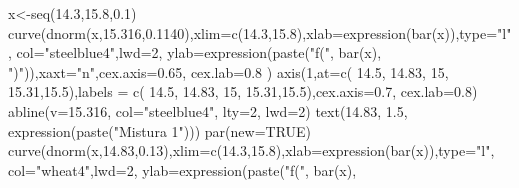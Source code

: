 \documentclass[
  letterpaper,
  DIV=11,
  numbers=noendperiod]{scrartcl}
\newenvironment{Shaded}{\begin{snugshade}}{\end{snugshade}}
\newcommand{\AttributeTok}[1]{\textcolor[rgb]{0.40,0.45,0.13}{#1}}
\newcommand{\ConstantTok}[1]{\textcolor[rgb]{0.56,0.35,0.01}{#1}}
\newcommand{\DecValTok}[1]{\textcolor[rgb]{0.68,0.00,0.00}{#1}}
\newcommand{\FloatTok}[1]{\textcolor[rgb]{0.68,0.00,0.00}{#1}}
\newcommand{\FunctionTok}[1]{\textcolor[rgb]{0.28,0.35,0.67}{#1}}
\newcommand{\NormalTok}[1]{\textcolor[rgb]{0.00,0.23,0.31}{#1}}
\newcommand{\OtherTok}[1]{\textcolor[rgb]{0.00,0.23,0.31}{#1}}
\newcommand{\StringTok}[1]{\textcolor[rgb]{0.13,0.47,0.30}{#1}}
\begin{document}
\begin{Shaded}
\begin{Highlighting}[]
\NormalTok{x}\OtherTok{\textless{}{-}}\FunctionTok{seq}\NormalTok{(}\FloatTok{14.3}\NormalTok{,}\FloatTok{15.8}\NormalTok{,}\FloatTok{0.1}\NormalTok{) }
\FunctionTok{curve}\NormalTok{(}\FunctionTok{dnorm}\NormalTok{(x,}\FloatTok{15.316}\NormalTok{,}\FloatTok{0.1140}\NormalTok{),}\AttributeTok{xlim=}\FunctionTok{c}\NormalTok{(}\FloatTok{14.3}\NormalTok{,}\FloatTok{15.8}\NormalTok{),}\AttributeTok{xlab=}\FunctionTok{expression}\NormalTok{(}\FunctionTok{bar}\NormalTok{(x)),}\AttributeTok{type=}\StringTok{"l"}\NormalTok{,}
      \AttributeTok{col=}\StringTok{"steelblue4"}\NormalTok{,}\AttributeTok{lwd=}\DecValTok{2}\NormalTok{, }\AttributeTok{ylab=}\FunctionTok{expression}\NormalTok{(}\FunctionTok{paste}\NormalTok{(}\StringTok{"f("}\NormalTok{, }\FunctionTok{bar}\NormalTok{(x),}
      \StringTok{")"}\NormalTok{)),}\AttributeTok{xaxt=}\StringTok{"n"}\NormalTok{,}\AttributeTok{cex.axis=}\FloatTok{0.65}\NormalTok{, }\AttributeTok{cex.lab=}\FloatTok{0.8}\NormalTok{ ) }
\FunctionTok{axis}\NormalTok{(}\DecValTok{1}\NormalTok{,}\AttributeTok{at=}\FunctionTok{c}\NormalTok{( }\FloatTok{14.5}\NormalTok{, }\FloatTok{14.83}\NormalTok{, }\DecValTok{15}\NormalTok{, }\FloatTok{15.31}\NormalTok{,}\FloatTok{15.5}\NormalTok{),}\AttributeTok{labels =}
       \FunctionTok{c}\NormalTok{( }\FloatTok{14.5}\NormalTok{, }\FloatTok{14.83}\NormalTok{, }\DecValTok{15}\NormalTok{, }\FloatTok{15.31}\NormalTok{,}\FloatTok{15.5}\NormalTok{),}\AttributeTok{cex.axis=}\FloatTok{0.7}\NormalTok{, }\AttributeTok{cex.lab=}\FloatTok{0.8}\NormalTok{) }
\FunctionTok{abline}\NormalTok{(}\AttributeTok{v=}\FloatTok{15.316}\NormalTok{, }\AttributeTok{col=}\StringTok{"steelblue4"}\NormalTok{, }\AttributeTok{lty=}\DecValTok{2}\NormalTok{, }\AttributeTok{lwd=}\DecValTok{2}\NormalTok{)}
\FunctionTok{text}\NormalTok{(}\FloatTok{14.83}\NormalTok{, }\FloatTok{1.5}\NormalTok{, }\FunctionTok{expression}\NormalTok{(}\FunctionTok{paste}\NormalTok{(}\StringTok{"Mistura 1"}\NormalTok{)))}
\FunctionTok{par}\NormalTok{(}\AttributeTok{new=}\ConstantTok{TRUE}\NormalTok{)}
\FunctionTok{curve}\NormalTok{(}\FunctionTok{dnorm}\NormalTok{(x,}\FloatTok{14.83}\NormalTok{,}\FloatTok{0.13}\NormalTok{),}\AttributeTok{xlim=}\FunctionTok{c}\NormalTok{(}\FloatTok{14.3}\NormalTok{,}\FloatTok{15.8}\NormalTok{),}\AttributeTok{xlab=}\FunctionTok{expression}\NormalTok{(}\FunctionTok{bar}\NormalTok{(x)),}\AttributeTok{type=}\StringTok{"l"}\NormalTok{,}
      \AttributeTok{col=}\StringTok{"wheat4"}\NormalTok{,}\AttributeTok{lwd=}\DecValTok{2}\NormalTok{, }\AttributeTok{ylab=}\FunctionTok{expression}\NormalTok{(}\FunctionTok{paste}\NormalTok{(}\StringTok{"f("}\NormalTok{, }\FunctionTok{bar}\NormalTok{(x),}

\end{Highlighting}
\end{Shaded}
\end{document}
